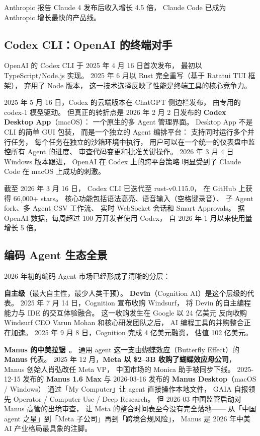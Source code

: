 Anthropic 报告 Claude 4 发布后收入增长 4.5 倍，
Claude Code 已成为 Anthropic 增长最快的产品线。

\subsection{Codex CLI：OpenAI 的终端对手}

OpenAI 的 Codex CLI 于 2025 年 4 月 16 日首次发布，
最初以 TypeScript/Node.js 实现。
2025 年 6 月以 Rust 完全重写（基于 Ratatui TUI 框架），
弃用了 Node 版本，
这一技术选择反映了性能是终端工具的核心竞争力。

2025 年 5 月 16 日，Codex 的云端版本在 ChatGPT 侧边栏发布，
由专用的 codex-1 模型驱动。
但真正的转折点是 2026 年 2 月 2 日发布的
\textbf{Codex Desktop App}（macOS）：
一个原生的多 Agent 管理界面。
Desktop App 不是 CLI 的简单 GUI 包装，
而是一个独立的 Agent 编排平台：
支持同时运行多个并行任务，
每个任务在独立的沙箱环境中执行，
用户可以在一个统一的仪表盘中监控所有 Agent 的进度、
审查代码变更和批准关键操作。
2026 年 3 月 4 日 Windows 版本跟进，
OpenAI 在 Codex 上的跨平台策略
明显受到了 Claude Code 在 macOS 上成功的刺激。

截至 2026 年 3 月 16 日，
Codex CLI 已迭代至 rust-v0.115.0，
在 GitHub 上获得 66,000+ stars。
核心功能包括语法高亮、语音输入（空格键录音）、
子 Agent fork、多 Agent CSV 工作流、
实时 WebSocket 会话和 Smart Approvals。
据 OpenAI 数据，每周超过 100 万开发者使用 Codex，
自 2026 年 1 月以来使用量增长 5 倍。

\subsection{编码 Agent 生态全景}

2026 年初的编码 Agent 市场已经形成了清晰的分层：

\textbf{自主级}（最大自主性，最少人类干预）。
\textbf{Devin}（Cognition AI）是这个层级的代表。
2025 年 7 月 14 日，Cognition 宣布收购 Windsurf，
将 Devin 的自主编程能力与 IDE 的交互体验融合。
这一收购发生在 Google 以 24 亿美元
反向收购 Windsurf CEO Varun Mohan 和核心研发团队之后，
AI 编程工具的并购整合正在加速。
2025 年 9 月 8 日，Cognition 完成 4 亿美元融资，
估值 102 亿美元。

\textbf{Manus 的中美拉锯}~\cite{manusmeta2025}。
通用 agent 这一支由蝴蝶效应（Butterfly Effect）的 \textbf{Manus} 代表。
2025 年 12 月，\textbf{Meta 以 \$2--3B 收购了蝴蝶效应母公司}，
Manus 创始人肖弘改任 Meta VP，
中国市场的 Monica 助手被同步下线。
2025-12-15 发布的 \textbf{Manus 1.6 Max} 与 2026-03-16 发布的
\textbf{Manus Desktop}（macOS / Windows）
通过「My Computer」让 agent 直接操作本地文件，
GAIA 自报领先 Operator / Computer Use / Deep Research。
但 2026-03 中国监管启动对 Manus 高管的出境审查，
让 Meta 的整合时间表至今没有完全落地——
从「中国 agent 之星」到「Meta 子公司」再到「跨境合规风险」，
Manus 是 2026 年中美 AI 产业格局最具象的注脚。

